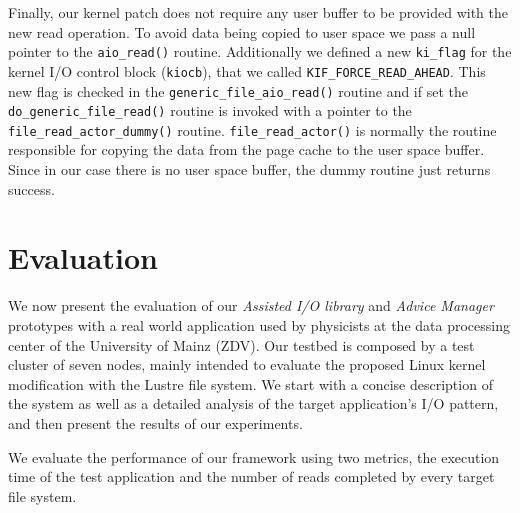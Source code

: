 Finally, our kernel patch does not require any user buffer to be provided with the new read operation. To avoid data being copied to user space we pass a null pointer to the \texttt{aio\_read()} routine. Additionally we defined a new \texttt{ki\_flag} for the 
kernel I/O control block (\texttt{kiocb}), that we called \texttt{KIF\_FORCE\_READ\_AHEAD}. This new flag is checked in the \texttt{generic\_file\_aio\_read()} routine and if set the \texttt{do\_generic\_file\_read()} routine is invoked with a pointer to the 
\texttt{file\_read\_actor\_dummy()} routine. \texttt{file\_read\_actor()} is normally the routine responsible for copying the data from the page cache to the user space buffer. Since in our case there is no user space buffer, the dummy routine just returns 
success.

\section{Evaluation}
\label{sec: mercury_evaluation}
We now present the evaluation of our \textit{Assisted I/O library} and \textit{Advice Manager} prototypes with a real world application used by physicists at the data processing center of the University of Mainz (ZDV). Our testbed is composed by 
a test cluster of seven nodes, mainly intended to evaluate the proposed Linux kernel modification with the Lustre file system. We start with a concise description of the system as well as a detailed analysis of the target application's I/O pattern, 
and then present the results of our experiments. 

We evaluate the performance of our framework using two metrics, the execution time of the test application and the number of reads completed by every target file system.

